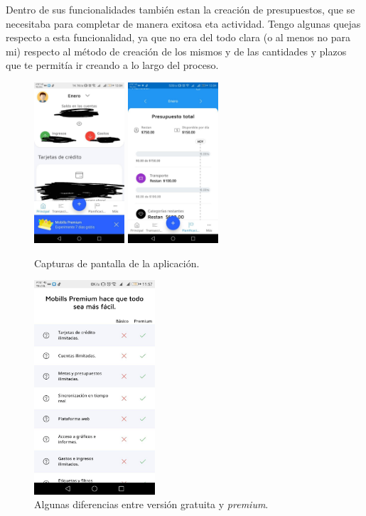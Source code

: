 \documentclass[11pt]{article}
\begin{document}
	\par Dentro de sus funcionalidades también estan la creación de presupuestos, que se necesitaba para completar de manera exitosa eta actividad. Tengo algunas quejas respecto a esta funcionalidad, ya que no era del todo clara (o al menos no para mi) respecto al método de creación de los mismos y de las cantidades y plazos que te permitía ir creando a lo largo del proceso.
	
	\begin{figure}[htp]
		\centering
		\includegraphics[width=0.3\textwidth]{assets/R4_U2-1.jpg}
		\includegraphics[width=0.3\textwidth]{assets/R4_U2-3.jpg}
		\caption{Capturas de pantalla de la aplicación.}
		\label{Capturas}
	\end{figure}
	
	\begin{figure}[htp]
		\centering
		\includegraphics[width=0.4\textwidth]{assets/R4_U2-2.jpg}
		\caption{Algunas diferencias entre versión gratuita y \textit{premium}.}
		\label{Capturas}
	\end{figure}
	
\end{document}
